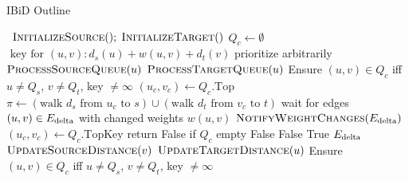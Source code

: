 \documentclass[nobib]{tufte-book}
\newcommand{\ms}[1]{\mbox{\scriptsize #1}}
\begin{document}
\begin{algorithm}[t]
   \caption{IBiD Outline}
   \label{alg:ibid}
   \begin{algorithmic}[1]
       {\,}
         \State $\mbox{\sc InitializeSource}(); \; \mbox{\sc InitializeTarget}()$
         \State $Q_c \gets \emptyset$
            \Comment $\mbox{ key for } (u,v): d_s(u) + w(u,v) + d_t(v)$
         \Loop
                     \Comment prioritize arbitrarily
                  \State $\mbox{\sc ProcessSourceQueue}(u)$
               \Else
                  \State $\mbox{\sc ProcessTargetQueue}(u)$
               \EndIf
               \State Ensure $(u,v) \in Q_c$ iff
                  $u \neq Q_s$, $v \neq Q_t$, key $\neq \infty$
            \EndWhile
            \State $(u_c,v_c) \gets Q_c.\mbox{Top}$
            \State $\pi \gets
               ( \mbox{walk } d_s \mbox{ from } u_c \mbox{ to } s )
               \cup
               ( \mbox{walk } d_t \mbox{ from } v_c \mbox{ to } t )$
            \State wait for edges $(u,v) \in E_{\ms{delta}}$ with changed weights $w(u,v)$
            \State $\mbox{\sc NotifyWeightChanges}(E_{\ms{delta}})$
         \EndLoop
      \EndProcedure
       {\,}
         \State $(u_c,v_c) \gets Q_c.\mbox{TopKey}$
            \Comment return False if $Q_c$ empty
            \State \Return False
         \EndIf
            \State \Return False
         \EndIf
         \State \Return True
      \EndFunction
       {$E_{\ms{delta}}$}
         \ForAll {$(u,v) \in E_{\ms{delta}}$}
            \State $\mbox{\sc UpdateSourceDistance}(v)$
            \State $\mbox{\sc UpdateTargetDistance}(u)$
         \EndFor
         \State Ensure $(u,v) \in Q_c$ iff
            $u \neq Q_s$, $v \neq Q_t$, key $\neq \infty$
      \EndProcedure
   \end{algorithmic}
\end{algorithm}
\end{document}
